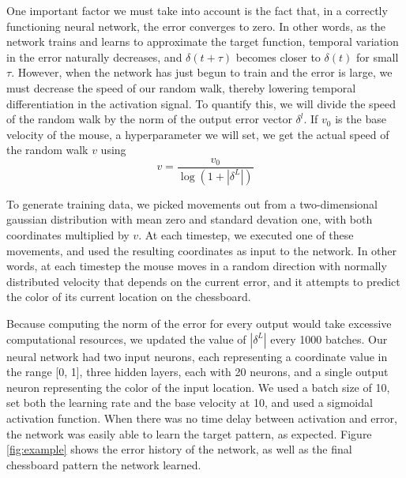 \documentclass[12pt]{article}
\begin{document}
One important factor we must take into account is the fact that, in a correctly functioning neural network, the error converges to zero. In other words, as the network trains and learns to approximate the target function, temporal variation in the error naturally decreases, and $\delta(t+\tau)$ becomes closer to $\delta(t)$ for small $\tau$. However, when the network has just begun to train and the error is large, we must decrease the speed of our random walk, thereby lowering temporal differentiation in the activation signal. To quantify this, we will divide the speed of the random walk by the norm of the output error vector $\delta^l$. If $v_0$ is the base velocity of the mouse, a hyperparameter we will set, we get the actual speed of the random walk $v$ using
\begin{equation}
	v = \frac{v_0}{\log(1+|\delta^L|)}
\end{equation}

To generate training data, we picked movements out from a two-dimensional gaussian distribution with mean zero and standard devation one, with both coordinates multiplied by $v$. At each timestep, we executed one of these movements, and used the resulting coordinates as input to the network. In other words, at each timestep the mouse moves in a random direction with normally distributed velocity that depends on the current error, and it attempts to predict the color of its current location on the chessboard.

Because computing the norm of the error for every output would take excessive computational resources, we updated the value of $|\delta^L|$ every 1000 batches. Our neural network had two input neurons, each representing a coordinate value in the range [0, 1], three hidden layers, each with 20 neurons, and a single output neuron representing the color of the input location. We used a batch size of 10, set both the learning rate and the base velocity at 10, and used a sigmoidal activation function. When there was no time delay between activation and error, the network was easily able to learn the target pattern, as expected. Figure \ref{fig:example} shows the error history of the network, as well as the final chessboard pattern the network learned.
\end{document}
